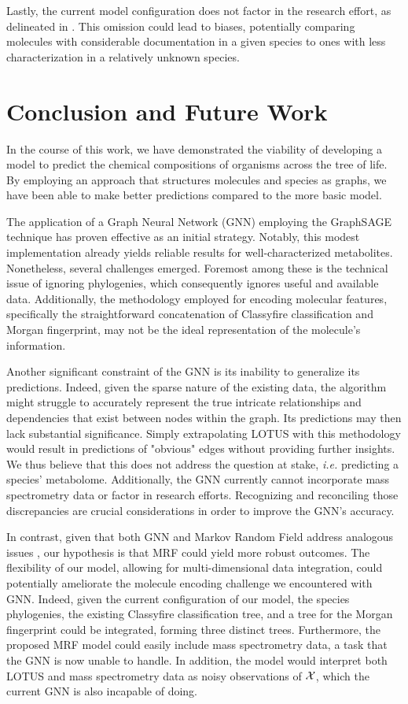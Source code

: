 \documentclass[
11pt, %
oneside, %
english, %
singlespacing, %
headsepline, %
chapterinoneline, %
]{MastersDoctoralThesis} %
\def\X{{\cal X}}
\begin{document}
Lastly, the current model configuration does not factor in the research effort, as delineated in . This omission could lead to biases, potentially comparing molecules with considerable documentation in a given species to ones with less characterization in a relatively unknown species.


\chapter{Conclusion and Future Work}
In the course of this work, we have demonstrated the viability of developing a model to predict the chemical compositions of organisms across the tree of life. By employing an approach that structures molecules and species as graphs, we have been able to make better predictions compared to the more basic model.

The application of a Graph Neural Network (GNN) employing the GraphSAGE technique has proven effective as an initial strategy. Notably, this modest implementation already yields reliable results for well-characterized metabolites. Nonetheless, several challenges emerged. Foremost among these is the technical issue of ignoring phylogenies, which consequently ignores useful and available data. Additionally, the methodology employed for encoding molecular features, specifically the straightforward concatenation of Classyfire classification and Morgan fingerprint, may not be the ideal representation of the molecule's information.

Another significant constraint of the GNN is its inability to generalize its predictions. Indeed, given the sparse nature of the existing data, the algorithm might struggle to accurately represent the true intricate relationships and dependencies that exist between nodes within the graph. Its predictions may then lack substantial significance. Simply extrapolating LOTUS with this methodology would result in predictions of "obvious" edges without providing further insights. We thus believe that this does not address the question at stake, \textit{i.e.} predicting a species' metabolome. Additionally, the GNN currently cannot incorporate mass spectrometry data or factor in research efforts. Recognizing and reconciling those discrepancies are crucial considerations in order to improve the GNN's accuracy. 

In contrast, given that both GNN and Markov Random Field address analogous issues \cite{jiaGraphBeliefPropagation2021}, our hypothesis is that MRF could yield more robust outcomes. The flexibility of our model, allowing for multi-dimensional data integration, could potentially ameliorate the molecule encoding challenge we encountered with GNN. Indeed, given the current configuration of our model, the species phylogenies, the existing Classyfire classification tree, and a tree for the Morgan fingerprint could be integrated, forming three distinct trees. Furthermore, the proposed MRF model could easily include mass spectrometry data, a task that the GNN is now unable to handle. In addition, the model would interpret both LOTUS and mass spectrometry data as noisy observations of $\X$, which the current GNN is also incapable of doing.
\end{document}
